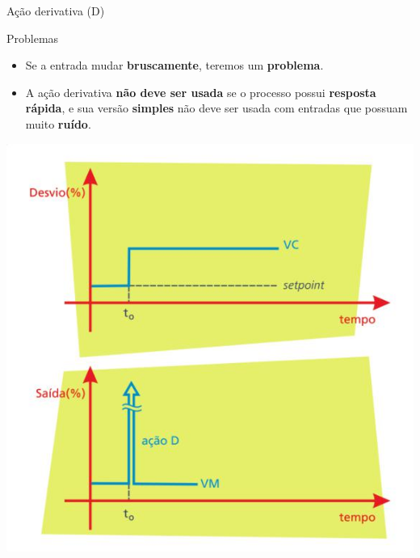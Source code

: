 \begin{frame}{Ação derivativa (D)}
	\begin{block}{Problemas}
		\begin{itemize}
			\item Se a entrada mudar \textbf{bruscamente}, teremos um \textbf{problema}.
			\item A ação derivativa \textbf{não deve ser usada} se o processo possui \textbf{resposta rápida}, e sua versão \textbf{simples} não deve ser usada com entradas que possuam muito \textbf{ruído}.
		\end{itemize}
	\end{block}
	
	
	\centering
	\includegraphics[height=0.6\textheight]{Figuras/Ch12/fig7}
\end{frame}


